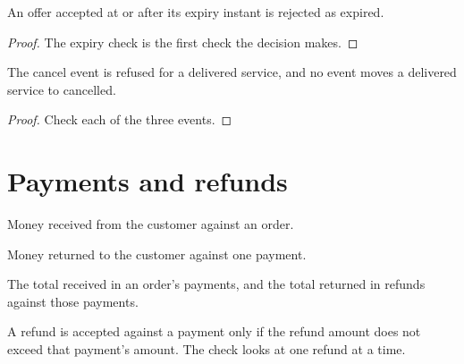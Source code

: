 \begin{theorem}
  \label{thm:accept-rejects-expired}
  An offer accepted at or after its expiry instant is rejected as expired.
\end{theorem}
\begin{proof}
  The expiry check is the first check the decision makes.
\end{proof}

\begin{theorem}
  \label{thm:delivered-not-cancellable}
  The cancel event is refused for a delivered service, and no event moves a
  delivered service to cancelled.
\end{theorem}
\begin{proof}
  Check each of the three events.
\end{proof}

\section{Payments and refunds}

\begin{definition}[Payment]
  \label{def:payment}
  Money received from the customer against an order.
\end{definition}

\begin{definition}[Refund]
  \label{def:refund}
  Money returned to the customer against one payment.
\end{definition}

\begin{definition}
  \label{def:totals}
  The total received in an order's payments, and the total returned in
  refunds against those payments.
\end{definition}

\begin{definition}
  \label{def:accept-refund}
  A refund is accepted against a payment only if the refund amount does not
  exceed that payment's amount.  The check looks at one refund at a time.
\end{definition}

